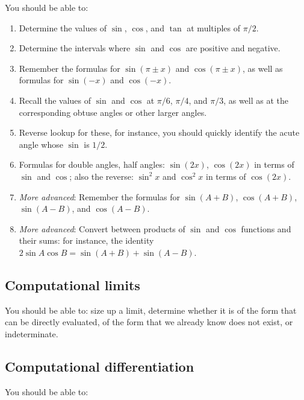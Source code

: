 \documentclass[10pt]{amsart}
\begin{document}
You should be able to:

\begin{enumerate}
\item Determine the values of $\sin$, $\cos$, and $\tan$ at multiples
  of $\pi/2$.
\item Determine the intervals where $\sin$ and $\cos$ are positive and
  negative.
\item Remember the formulas for $\sin(\pi \pm x )$ and $\cos(\pi \pm x)$,
  as well as formulas for $\sin(-x)$ and $\cos(-x)$.
\item Recall the values of $\sin$ and $\cos$ at $\pi/6$, $\pi/4$, and
  $\pi/3$, as well as at the corresponding obtuse angles or other
  larger angles.
\item Reverse lookup for these, for instance, you should quickly
  identify the acute angle whose $\sin$ is $1/2$.
\item Formulas for double angles, half angles: $\sin(2x)$, $\cos(2x)$
  in terms of $\sin$ and $\cos$; also the reverse: $\sin^2x$ and
  $\cos^2x$ in terms of $\cos(2x)$.
\item {\em More advanced}: Remember the formulas for $\sin(A + B)$,
  $\cos(A + B)$, $\sin(A - B)$, and $\cos(A - B)$.
\item {\em More advanced}: Convert between products of $\sin$ and
  $\cos$ functions and their sums: for instance, the identity $2\sin A
  \cos B = \sin(A + B) + \sin (A - B)$.
\end{enumerate}

\subsection{Computational limits}

You should be able to: size up a limit, determine whether it is of the
form that can be directly evaluated, of the form that we already know
does not exist, or indeterminate.

\subsection{Computational differentiation}

You should be able to:
\end{document}

